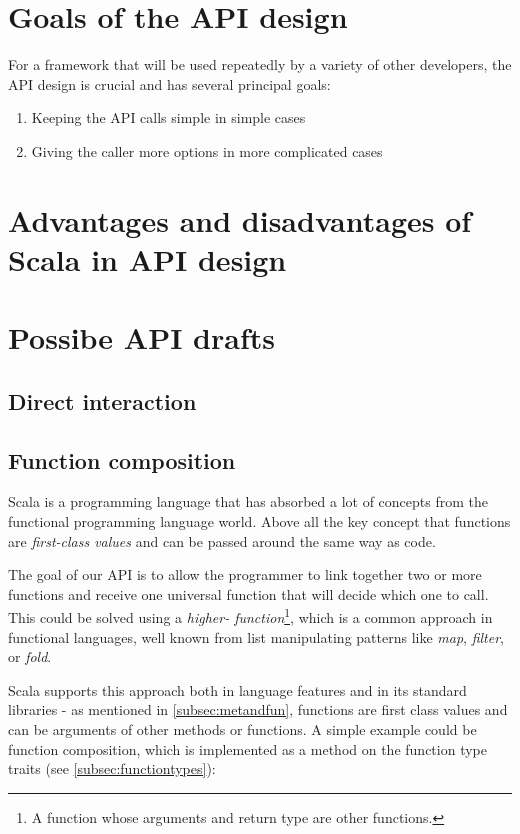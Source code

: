 \section{Goals of the API design}

For a framework that will be used repeatedly by a variety of other developers, the API design is crucial and has several principal goals:

\begin{enumerate}
	\item Keeping the API calls simple in simple cases
	\item Giving the caller more options in more complicated cases
\end{enumerate}

\section{Advantages and disadvantages of Scala in API design}


\section{Possibe API drafts}

\subsection{Direct interaction}

\subsection{Function composition}

Scala is a programming language that has absorbed a lot of concepts from the functional programming language world. Above all the key concept that functions are \textit{first-class values} and can be passed around the same way as code.

The goal of our API is to allow the programmer to link together two or more functions and receive one universal function that will decide which one to call. This could be solved using a \textit{higher- function}\footnote{A function whose arguments and return type are other functions.}, which is a common approach in functional languages, well known from list manipulating patterns like \textit{map}, \textit{filter}, or \textit{fold}.

Scala supports this approach both in language features and in its standard libraries - as mentioned in \ref{subsec:metandfun}, functions are first class values and can be arguments of other methods or functions. A simple example could be function composition, which is implemented as a method on the function type traits (see \ref{subsec:functiontypes}):

